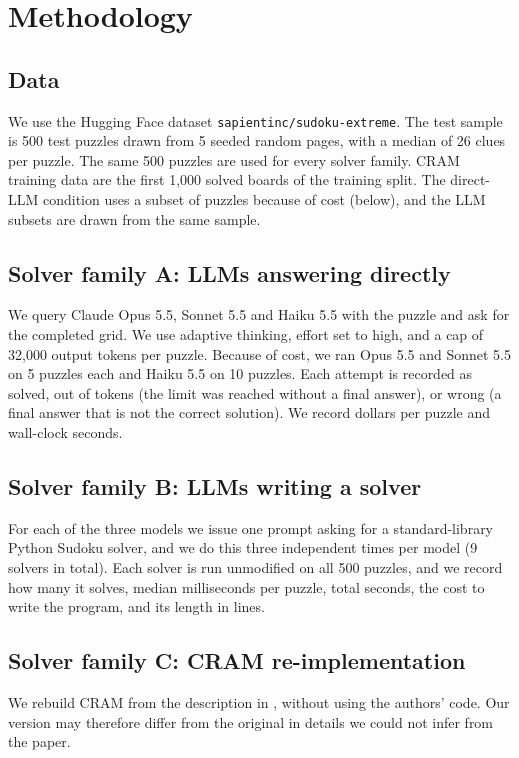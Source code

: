 \documentclass{article} %
\begin{document}
\section{Methodology}
\label{sec:method}
\subsection{Data}
We use the Hugging Face dataset \texttt{sapientinc/sudoku-extreme}. The test sample is 500 test puzzles drawn from 5 seeded random pages, with a median of 26 clues per puzzle. The same 500 puzzles are used for every solver family. CRAM training data are the first 1,000 solved boards of the training split. The direct-LLM condition uses a subset of puzzles because of cost (below), and the LLM subsets are drawn from the same sample.

\subsection{Solver family A: LLMs answering directly}
We query Claude Opus 5.5, Sonnet 5.5 and Haiku 5.5 with the puzzle and ask for the completed grid. We use adaptive thinking, effort set to high, and a cap of 32,000 output tokens per puzzle. Because of cost, we ran Opus 5.5 and Sonnet 5.5 on 5 puzzles each and Haiku 5.5 on 10 puzzles. Each attempt is recorded as solved, out of tokens (the limit was reached without a final answer), or wrong (a final answer that is not the correct solution). We record dollars per puzzle and wall-clock seconds.

\subsection{Solver family B: LLMs writing a solver}
For each of the three models we issue one prompt asking for a standard-library Python Sudoku solver, and we do this three independent times per model (9 solvers in total). Each solver is run unmodified on all 500 puzzles, and we record how many it solves, median milliseconds per puzzle, total seconds, the cost to write the program, and its length in lines.

\subsection{Solver family C: CRAM re-implementation}
\label{sec:cram}
We rebuild CRAM from the description in \citet{hoover2026cram}, without using the authors' code. Our version may therefore differ from the original in details we could not infer from the paper.
\end{document}
